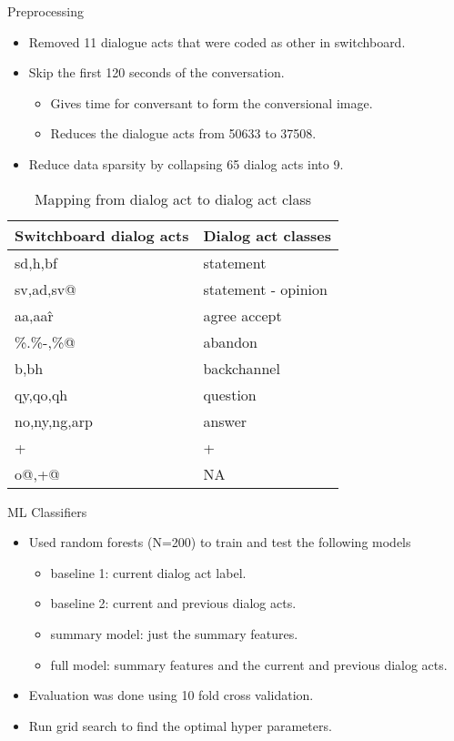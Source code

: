 \documentclass[t]{beamer}
\begin{document}
\begin{frame}{Preprocessing}
  \begin{itemize}
    \item Removed 11 dialogue acts that were coded as other in switchboard.
    \item Skip the first 120 seconds of the conversation. 
      \begin{itemize}
      \item Gives time for conversant to form the conversional image. 
      \item Reduces the dialogue acts from 50633 to 37508.
      \end{itemize}
    \item Reduce data sparsity by collapsing 65 dialog acts into 9.
  \end{itemize}

  \begin{table}
     \begin{center}
     \begin{tabular}{l | l}
    \hline
Switchboard dialog acts &  Dialog act classes  \\
    \hline
sd,h,bf      & statement   \\
sv,ad,sv@    & statement - opinion  \\
aa,aa\^r     & agree accept \\
\%.\%-,\%@   & abandon      \\
b,bh         & backchannel  \\
qy,qo,qh     & question     \\
no,ny,ng,arp & answer       \\
+            & +            \\
o@,+@        & NA           \\
  \hline
\end{tabular}
\end{center}\vspace{-0.5em}
\caption{Mapping from dialog act to dialog act class}
\label{tab:mapping}
\end{table}
\end{frame}


\begin{frame}{ML Classifiers}
  \begin{itemize}
  \item Used random forests (N=200) to train and test the following models
  \begin{itemize}
    \item baseline 1: current dialog act label.
    \item baseline 2: current and previous dialog acts.
    \item summary model: just the summary features.
    \item full model: summary features and the current and previous dialog acts.
  \end{itemize}
  \item Evaluation was done using 10 fold cross validation. 
  \item Run grid search to find the optimal hyper parameters. 
  \end{itemize}
\end{frame}
\end{document}
